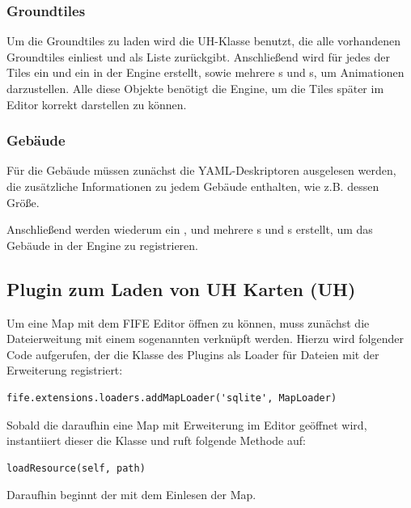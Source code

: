 \subsubsection{Groundtiles}
Um die Groundtiles zu laden wird die UH-Klasse  benutzt,
die alle vorhandenen Groundtiles einliest und als Liste zurückgibt. Anschließend
wird für jedes der Tiles ein  und ein  in der
Engine erstellt, sowie mehrere s und s, um Animationen darzustellen.
Alle diese Objekte benötigt die Engine, um die Tiles später im Editor korrekt
darstellen zu können.

\subsubsection{Gebäude}
Für die Gebäude müssen zunächst die YAML-Deskriptoren ausgelesen werden, die
zusätzliche Informationen zu jedem Gebäude enthalten, wie z.B. dessen Größe.

Anschließend werden wiederum ein ,  und
mehrere s und s erstellt, um das Gebäude in
der Engine zu registrieren.


\subsection{Plugin zum Laden von UH Karten (UH)}
\label{sec:registerMapLoader}
Um eine Map mit dem FIFE Editor öffnen zu können, muss zunächst die
Dateierweitung mit einem sogenannten  verknüpft werden.
Hierzu wird folgender Code
aufgerufen, der die Klasse  des  Plugins
als Loader für Dateien mit der Erweiterung  registriert:

\begin{lstlisting}
fife.extensions.loaders.addMapLoader('sqlite', MapLoader)
\end{lstlisting}

Sobald die daraufhin eine Map mit  Erweiterung im Editor geöffnet
wird, instantiiert dieser die  Klasse und ruft folgende Methode
auf:

\begin{lstlisting}
loadResource(self, path)
\end{lstlisting}

Daraufhin beginnt der  mit dem Einlesen der Map.

